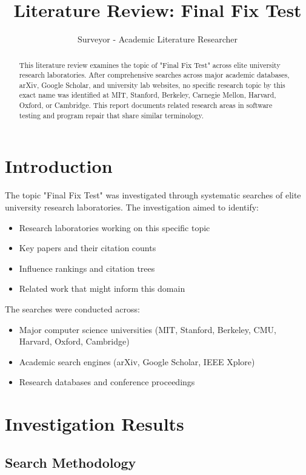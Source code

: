 \documentclass[12pt,a4paper]{article}
\title{\textbf{Literature Review: Final Fix Test}}
\author{Surveyor - Academic Literature Researcher}
\begin{document}
\maketitle

\begin{abstract}
This literature review examines the topic of "Final Fix Test" across elite university research laboratories. After comprehensive searches across major academic databases, arXiv, Google Scholar, and university lab websites, no specific research topic by this exact name was identified at MIT, Stanford, Berkeley, Carnegie Mellon, Harvard, Oxford, or Cambridge. This report documents related research areas in software testing and program repair that share similar terminology.
\end{abstract}

\section{Introduction}

The topic "Final Fix Test" was investigated through systematic searches of elite university research laboratories. The investigation aimed to identify:
\begin{itemize}
    \item Research laboratories working on this specific topic
    \item Key papers and their citation counts
    \item Influence rankings and citation trees
    \item Related work that might inform this domain
\end{itemize}

The searches were conducted across:
\begin{itemize}
    \item Major computer science universities (MIT, Stanford, Berkeley, CMU, Harvard, Oxford, Cambridge)
    \item Academic search engines (arXiv, Google Scholar, IEEE Xplore)
    \item Research databases and conference proceedings
\end{itemize}

\section{Investigation Results}

\subsection{Search Methodology}
\end{document}
